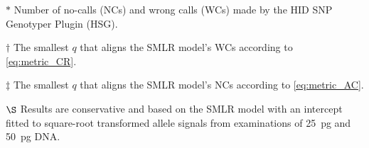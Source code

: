 \begin{table*}
\begin{adjustbox}{max width=\textwidth}
\begin{threeparttable}
\begin{tabular}{llrrrrrrrrrr}
   \bottomrule[2pt]
\end{tabular}
\begin{tablenotes}
\item[$*$] Number of no-calls (NCs) and wrong calls (WCs) made by the HID SNP Genotyper Plugin (HSG).
\item[$\dagger$] The smallest $q$ that aligns the SMLR model's WCs according to \eqref{eq:metric_CR}.
\item[$\ddagger$] The smallest $q$ that aligns the SMLR model's NCs according to \eqref{eq:metric_AC}.
\item[$\S$] Results are conservative and based on the SMLR model with an intercept fitted to square-root transformed allele signals from examinations of \SI{25}{\pg} and \SI{50}{\pg} DNA.
\end{tablenotes}
\end{threeparttable}
\end{adjustbox}
\end{table*}
